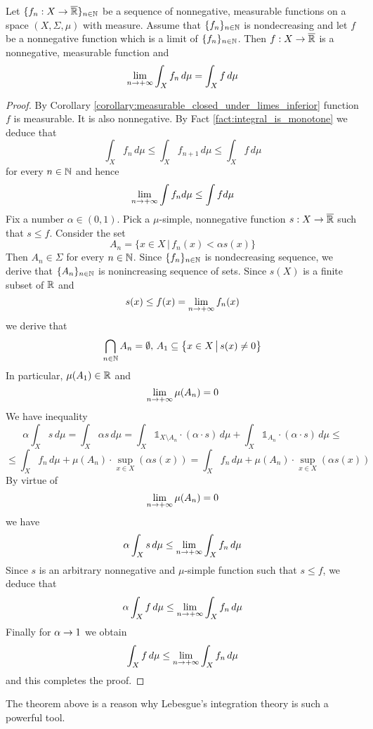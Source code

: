 \begin{theorem}\label{theorem:monotone_convergence}
    Let $\{f_n:X\rightarrow \overline{{\mathbb R}}\}_{n\in {\mathbb N}}$ be a sequence of nonnegative, measurable functions on a space $(X,\Sigma,\mu)$ with measure. Assume that $\{f_n\}_{n\in {\mathbb N}}$ is nondecreasing and let $f$ be a nonnegative function which is a limit of $\{f_n\}_{n\in {\mathbb N}}$. Then $f:X\rightarrow \overline{{\mathbb R}}$ is a nonnegative, measurable function and
    $$\lim_{n\rightarrow +\infty}\int_X f_n\, d\mu = \int_X f\, d\mu$$
\end{theorem}
\begin{proof}
    By Corollary \ref{corollary:measurable_closed_under_limes_inferior} function $f$ is measurable. It is also nonnegative. By Fact \ref{fact:integral_is_monotone} we deduce that
    $$\int_X f_n\,d\mu \leq \int_X f_{n+1}\,d\mu \leq \int_X f\, d\mu$$
    for every $n\in {\mathbb N}$ and hence
    $$\lim_{n\rightarrow +\infty}\int f_n d\mu \leq \int f d\mu$$
    Fix a number $\alpha \in (0,1)$. Pick a $\mu$-simple, nonnegative function $s:X\rightarrow \overline{{\mathbb R}}$ such that $s\leq f$. Consider the set
    $$A_n = \big\{x\in X\,\big|\, f_n(x)< \alpha s(x)\big\}$$
    Then $A_n\in \Sigma$ for every $n\in {\mathbb N}$. Since $\{f_n\}_{n\in {\mathbb N}}$ is nondecreasing sequence, we derive that $\{A_n\}_{n\in {\mathbb N}}$ is nonincreasing sequence of sets. Since $s(X)$ is a finite subset of ${\mathbb R}$ and
    $$s(x)\leq f(x) = \lim_{n\rightarrow +\infty}f_n(x)$$
    we derive that
    $$\bigcap_{n\in {\mathbb N}}A_n = \emptyset,\,A_1\subseteq \big\{x\in X\,\big|\,s(x)\neq 0\big\}$$
    In particular, $\mu(A_1) \in {\mathbb R}$ and
    $$\lim_{n\rightarrow +\infty}\mu(A_n)=0$$
    We have inequality
    $$\alpha  \int_Xs\,d\mu = \int_X\alpha s\,d\mu = \int_X  \mathbb{1}_{X\setminus A_n}\cdot \left(\alpha \cdot s\right)\,d\mu +  \int_X \mathbb{1}_{A_n}\cdot \left(\alpha \cdot s\right)\,d\mu \leq $$
    $$\leq \int_X f_n\,d\mu + \mu(A_n)\cdot \sup_{x\in X}\left(\alpha s(x)\right) = \int_X f_n\,d\mu + \mu(A_n)\cdot \sup_{x\in X}\left(\alpha s(x)\right)$$
    By virtue of
    $$\lim_{n\rightarrow +\infty} \mu(A_n) = 0$$
    we have
    $$\alpha  \int_Xs\,d\mu \leq \lim_{n\rightarrow +\infty}\int_Xf_n\,d\mu$$
    Since $s$ is an arbitrary nonnegative and $\mu$-simple function such that $s\leq f$, we deduce that
    $$\alpha  \int_Xf\,d\mu \leq \lim_{n\rightarrow +\infty}\int_Xf_n\,d\mu$$
    Finally for $\alpha \rightarrow 1$ we obtain
    $$\int_Xf\,d\mu \leq  \lim_{n\rightarrow +\infty}\int_Xf_n\,d\mu$$
    and this completes the proof.
\end{proof}
\noindent
The theorem above is a reason why Lebesgue's integration theory is such a powerful tool.

